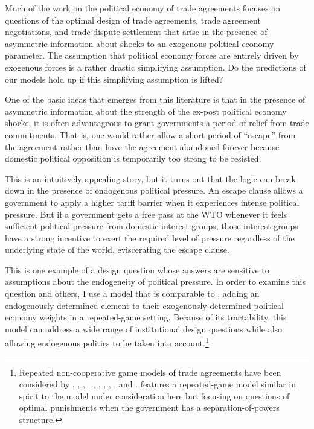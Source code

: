 Much of the work on the political economy of trade agreements focuses on questions of the optimal design of trade agreements, trade agreement negotiations, and trade dispute settlement that arise in the presence of asymmetric information about shocks to an exogenous political economy parameter. The assumption that political economy forces are entirely driven by exogenous forces is a rather drastic simplifying assumption. Do the predictions of our models hold up if this simplifying assumption is lifted?

One of the basic ideas that emerges from this literature is that in the presence of asymmetric information about the strength of the ex-post political economy shocks, it is often advantageous to grant governments a period of relief from trade commitments. That is, one would rather allow a short period of ``escape'' from the agreement rather than have the agreement abandoned forever because domestic political opposition is temporarily too strong to be resisted.

This is an intuitively appealing story, but it turns out that the logic can break down in the presence of endogenous political pressure. An escape clause allows a government to apply a higher tariff barrier when it experiences intense political pressure. But if a government gets a free pass at the WTO whenever it feels sufficient political pressure from domestic interest groups, those interest groups have a strong incentive to exert the required level of pressure regardless of the underlying state of the world, eviscerating the escape clause.

This is one example of a design question whose answers are sensitive to assumptions about the endogeneity of political pressure. In order to examine this question and others, I use a model that is comparable to \Textcite{bs2005}, adding an endogenously-determined element to their exogenously-determined political economy weights in a repeated-game setting. Because of its tractability, this model can address a wide range of institutional design questions while also allowing endogenous politics to be taken into account.\footnote{Repeated non-cooperative game models of trade agreements have been considered by \Textcite{mcm86,mcm89}, \Textcite{dixit1987}, \Textcite{bs1990, bs1997a, bs1997b, bs2002}, \Textcite{kovthurs}, \Textcite{maggi99}, \Textcite{coatesludema}, \Textcite{ederington}, \Textcite{rosendorff}, \Textcite{bagwell2009}, and \Textcite{park}. \Textcite{buzard2013a} features a repeated-game model similar in spirit to the model under consideration here but focusing on questions of optimal punishments when the government has a separation-of-powers structure.}

